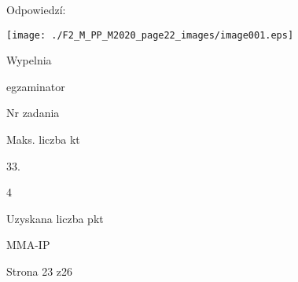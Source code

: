 \documentclass[a4paper,12pt]{article}
\begin{document}
Odpowiedzí:
\begin{center}
\texttt{[image: ./F2\_M\_PP\_M2020\_page22\_images/image001.eps]}
\end{center}
Wypelnia

egzaminator

Nr zadania

Maks. liczba kt

33.

4

Uzyskana liczba pkt

MMA-IP

Strona 23 z26
\end{document}
